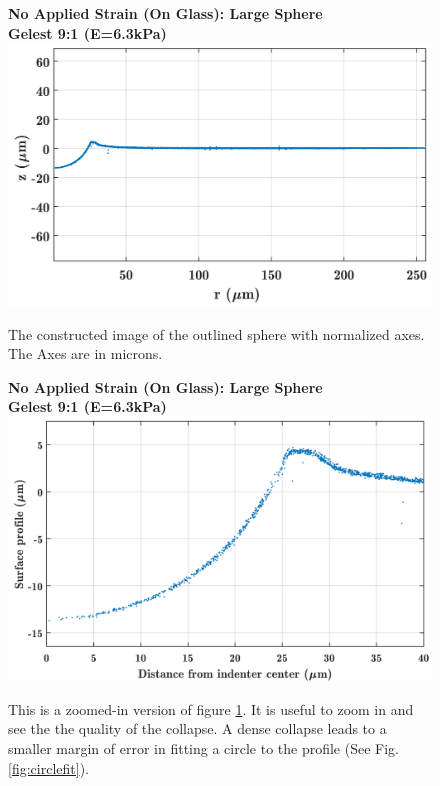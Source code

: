 \begin{figure}[h!]
	\centering
	\large \textbf{No Applied Strain (On Glass): Large Sphere}\\ \vspace{.4 em}
	\large \textbf{Gelest 9:1 (E=6.3kPa)}
	\includegraphics[width=\linewidth]{Chapters/Figures/sphere011_ia/side_collapsed}
	\caption[Collapsed Side Profile]{The constructed image of the outlined sphere with normalized axes. The Axes are in microns.}
	\label{fig:sidecollapsed}
\end{figure}
\begin{figure}[h!]
	\centering
	\large \textbf{No Applied Strain (On Glass): Large Sphere}\\ \vspace{.4 em}
	\large \textbf{Gelest 9:1 (E=6.3kPa)}
	\includegraphics[width=\linewidth]{Chapters/Figures/sphere011_ia/side_collapsed_zoomed}
	\caption[Collapsed Side Profile: Zoomed]{This is a zoomed-in version of figure \ref{fig:sidecollapsed}. It is useful to zoom in and see the the quality of the collapse. A dense collapse leads to a smaller margin of error in fitting a circle to the profile (See Fig. \ref{fig:circlefit}).}
	\label{fig:sidecollapsedzoomed}
\end{figure}

